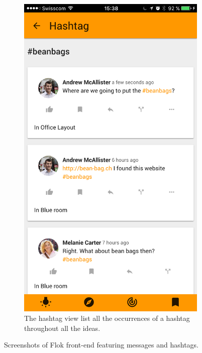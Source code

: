 \documentclass[a4paper,12pt, oneside]{article}
\begin{document}
\begin{figure}[!htb]
\begin{subfigure}[t]{.32\textwidth}
        \centering
        \includegraphics[width=\textwidth]{images/hashtagView.png}
        \caption{The hashtag view list all the occurrences of a hashtag throughout all the ideas.}
        \label{fig.hashtagView}
    \end{subfigure}
    \hfill\null
    \caption{Screenshots of Flok front-end featuring messages and hashtags.}
\end{figure}
\end{document}
